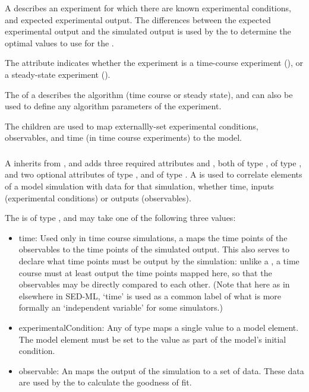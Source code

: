 \begin{blockChanged}

A \FitExperiment describes an experiment for which there are known experimental conditions, and expected experimental output.  The differences between the expected experimental output and the simulated output is used by the \Objective to determine the optimal values to use for the \AdjustableParameters.


The  attribute indicates whether the experiment is a time-course experiment (), or a steady-state experiment ().

The \Algorithm of a \FitExperiment describes the algorithm (time course or steady state), and can also be used to define any algorithm parameters of the experiment.

The \FitMapping children are used to map externallly-set experimental conditions, observables, and time (in time course experiments) to the model.


\subsubsection{}
\label{class:fitMapping}

A \FitMapping inherits from \SedBase, and adds three required attributes  and , both of type \SIdRef,  of type \MappingType, and two optional attributes  of type , and  of type \SIdRef.  A \FitMapping is used to correlate elements of a model simulation with data for that simulation, whether time, inputs (experimental conditions) or outputs (observables).

The  is of type \MappingType, and may take one of the following three values:

\begin{itemize}
\item time:  Used only in time course simulations, a  \FitMapping maps the time points of the observables to the time points of the simulated output.  This also serves to declare what time points must be output by the simulation:  unlike a \UniformTimeCourse, a \FitExperiment time course must at least output the time points mapped here, so that the observables may be directly compared to each other.  (Note that here as in elsewhere in SED-ML, `time' is used as a common label of what is more formally an `independent variable' for some simulators.)
\item experimentalCondition:  Any \FitMapping of type  maps a single value to a model element.  The model element must be set to the value as part of the model's initial condition.
\item observable:  An  \FitMapping maps the output of the simulation to a set of data.  These data  are used by the \Objective to calculate the goodness of fit.
\end{itemize}


\end{blockChanged}
